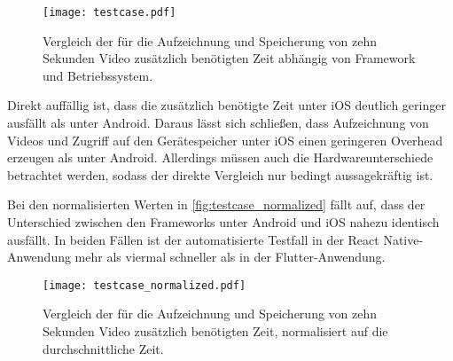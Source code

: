 \begin{figure}[ht]
  \centering 
  \texttt{[image: testcase.pdf]}
  \caption{Vergleich der für die Aufzeichnung und Speicherung von zehn Sekunden Video zusätzlich benötigten Zeit abhängig von Framework und Betriebssystem.}
  \label{fig:testcase}
\end{figure}

Direkt auffällig ist, dass die zusätzlich benötigte Zeit unter iOS deutlich geringer ausfällt als unter Android.
Daraus lässt sich schließen, dass Aufzeichnung von Videos und Zugriff auf den Gerätespeicher unter iOS einen geringeren Overhead erzeugen als unter Android.
Allerdings müssen auch die Hardwareunterschiede betrachtet werden, sodass der direkte Vergleich nur bedingt aussagekräftig ist.

Bei den normalisierten Werten in \autoref{fig:testcase_normalized} fällt auf, dass der Unterschied zwischen den Frameworks unter Android und iOS nahezu identisch ausfällt.
In beiden Fällen ist der automatisierte Testfall in der React Native-Anwendung mehr als viermal schneller als in der Flutter-Anwendung.
\begin{figure}[ht]
  \centering 
  \texttt{[image: testcase\_normalized.pdf]}
  \caption{Vergleich der für die Aufzeichnung und Speicherung von zehn Sekunden Video zusätzlich benötigten Zeit, normalisiert auf die durchschnittliche Zeit.}
  \label{fig:testcase_normalized}
\end{figure}